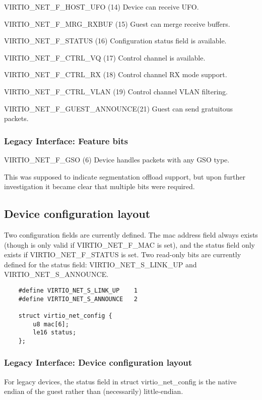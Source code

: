   VIRTIO_NET_F_HOST_UFO (14) Device can receive UFO.

  VIRTIO_NET_F_MRG_RXBUF (15) Guest can merge receive buffers.

  VIRTIO_NET_F_STATUS (16) Configuration status field is
    available.

  VIRTIO_NET_F_CTRL_VQ (17) Control channel is available.

  VIRTIO_NET_F_CTRL_RX (18) Control channel RX mode support.

  VIRTIO_NET_F_CTRL_VLAN (19) Control channel VLAN filtering.

  VIRTIO_NET_F_GUEST_ANNOUNCE(21) Guest can send gratuitous
    packets.

\subsubsection{Legacy Interface: Feature bits}\label{sec:Device Types / Network Device / Feature bits / Legacy Interface: Feature bits}
VIRTIO_NET_F_GSO (6) Device handles packets with any GSO type.

This was supposed to indicate segmentation offload support, but
upon further investigation it became clear that multiple bits
were required.

\subsection{Device configuration layout}\label{sec:Device Types / Network Device / Device configuration layout}

Two configuration fields are currently defined. The mac address field
always exists (though is only valid if VIRTIO_NET_F_MAC is set), and
the status field only exists if VIRTIO_NET_F_STATUS is set. Two
read-only bits are currently defined for the status field:
VIRTIO_NET_S_LINK_UP and VIRTIO_NET_S_ANNOUNCE.

\begin{lstlisting}
	#define VIRTIO_NET_S_LINK_UP	1
	#define VIRTIO_NET_S_ANNOUNCE	2

	struct virtio_net_config {
		u8 mac[6];
		le16 status;
	};
\end{lstlisting}

\subsubsection{Legacy Interface: Device configuration layout}\label{sec:Device Types / Network Device / Device configuration layout / Legacy Interface: Device configuration layout}
For legacy devices, the status field in struct virtio_net_config is the
native endian of the guest rather than (necessarily) little-endian.


